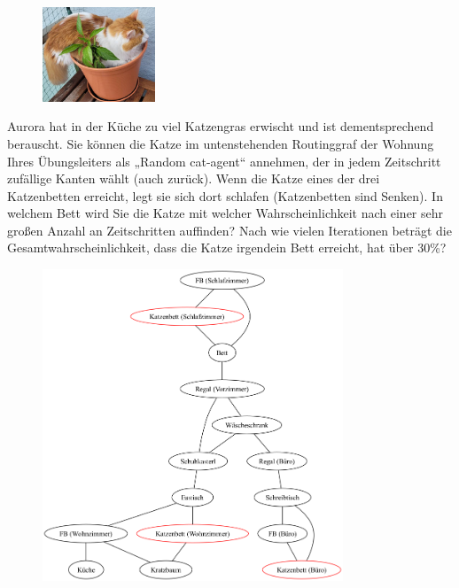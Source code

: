 \documentclass[a4paper,11pt]{report}
\begin{document}
    \begin{figure}
        \centering
        \includegraphics[width=0.3\textwidth]{a07a_cat}
        \label{fig:a06_cat}
    \end{figure}

    Aurora hat in der Küche zu viel Katzengras erwischt und ist dementsprechend berauscht.
    Sie können die Katze im untenstehenden Routinggraf der Wohnung Ihres Übungsleiters als „Random cat-agent“ annehmen,
    der in jedem Zeitschritt zufällige Kanten wählt (auch zurück).
    Wenn die Katze eines der drei Katzenbetten erreicht, legt sie sich dort schlafen (Katzenbetten sind Senken).
    In welchem Bett wird Sie die Katze mit welcher Wahrscheinlichkeit nach einer sehr großen Anzahl an Zeitschritten auffinden?
    Nach wie vielen Iterationen beträgt die Gesamtwahrscheinlichkeit, dass die Katze irgendein Bett erreicht, hat über 30\%?

    \begin{figure}[h]
        \centering
        \includegraphics[width=0.8\textwidth]{a07a_graph}
        \label{fig:a07_graph}
    \end{figure}
\end{document}
